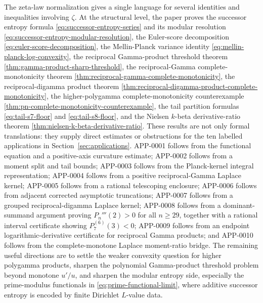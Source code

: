 \documentclass[11pt]{article}
\numberwithin{equation}{section}
\theoremstyle{definition}
\theoremstyle{remark}
\newcommand{\1}{\mathbf 1}
\begin{document}
The zeta-law normalization gives a single language for several identities and inequalities involving \(\zeta\).  At the structural level, the paper proves the successor entropy formula \eqref{eq:successor-entropy-series} and its modular resolution \eqref{eq:successor-entropy-modular-resolution}, the Euler-score decomposition \eqref{eq:euler-score-decomposition}, the Mellin-Planck variance identity \eqref{eq:mellin-planck-log-convexity}, the reciprocal Gamma-product threshold theorem \eqref{thm:gamma-product-sharp-threshold}, the reciprocal-Gamma complete-monotonicity theorem \eqref{thm:reciprocal-gamma-complete-monotonicity}, the reciprocal-digamma product theorem \eqref{thm:reciprocal-digamma-product-complete-monotonicity}, the higher-polygamma complete-monotonicity counterexample \eqref{thm:pn-complete-monotonicity-counterexample}, the tail partition formulas \eqref{eq:tail-s7-floor} and \eqref{eq:tail-s8-floor}, and the Nielsen \(k\)-beta derivative-ratio theorem \eqref{thm:nielsen-k-beta-derivative-ratio}.  These results are not only formal translations: they supply direct estimates or obstructions for the ten labelled applications in Section~\ref{sec:applications}.  APP-0001 follows from the functional equation and a positive-axis curvature estimate; APP-0002 follows from a moment split and tail bounds; APP-0003 follows from the Planck-kernel integral representation; APP-0004 follows from a positive reciprocal-Gamma Laplace kernel; APP-0005 follows from a rational telescoping enclosure; APP-0006 follows from adjacent corrected asymptotic truncations; APP-0007 follows from a grouped reciprocal-digamma Laplace kernel; APP-0008 follows from a dominant-summand argument proving \(P_n'''(2)>0\) for all \(n\ge29\), together with a rational interval certificate showing \(P_7^{(6)}(3)<0\); APP-0009 follows from an endpoint logarithmic-derivative certificate for reciprocal Gamma products; and APP-0010 follows from the complete-monotone Laplace moment-ratio bridge.  The remaining useful directions are to settle the weaker convexity question for higher polygamma products, sharpen the polynomial Gamma-product threshold problem beyond monotone \(u'/u\), and sharpen the modular entropy side, especially the prime-modulus functionals in \eqref{eq:prime-functional-limit}, where additive successor entropy is encoded by finite Dirichlet \(L\)-value data.
\end{document}
